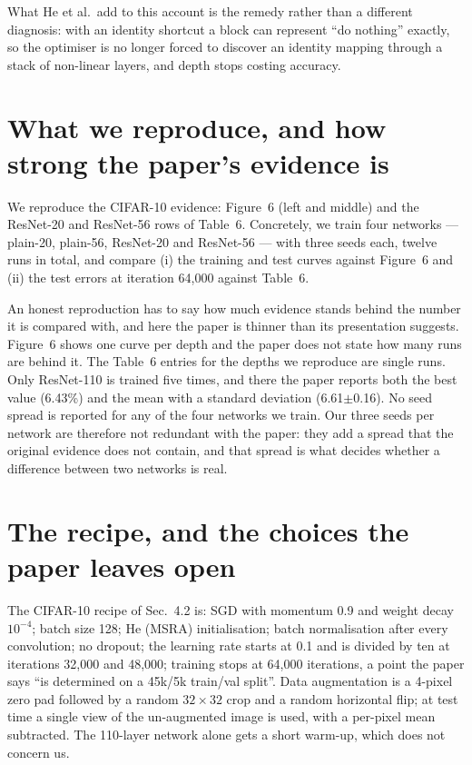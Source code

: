 \documentclass[11pt,a4paper]{article}
\begin{document}
What He et al.\ add to this account is the remedy rather than a different
diagnosis: with an identity shortcut a block can represent ``do nothing''
exactly, so the optimiser is no longer forced to discover an identity mapping
through a stack of non-linear layers, and depth stops costing accuracy.

\section{What we reproduce, and how strong the paper's evidence is}

We reproduce the CIFAR-10 evidence: Figure~6 (left and middle) and the
ResNet-20 and ResNet-56 rows of Table~6. Concretely, we train four networks ---
plain-20, plain-56, ResNet-20 and ResNet-56 --- with three seeds each, twelve
runs in total, and compare (i) the training and test curves against Figure~6
and (ii) the test errors at iteration 64{,}000 against Table~6.

An honest reproduction has to say how much evidence stands behind the number it
is compared with, and here the paper is thinner than its presentation suggests.
Figure~6 shows one curve per depth and the paper does not state how many runs
are behind it. The Table~6 entries for the depths we reproduce are single runs.
Only ResNet-110 is trained five times, and there the paper reports both the best
value (6.43\%) and the mean with a standard deviation (6.61$\pm$0.16). No seed
spread is reported for any of the four networks we train. Our three seeds per
network are therefore not redundant with the paper: they add a spread that the
original evidence does not contain, and that spread is what decides whether a
difference between two networks is real.

\section{The recipe, and the choices the paper leaves open}

The CIFAR-10 recipe of Sec.~4.2 is: SGD with momentum 0.9 and weight decay
$10^{-4}$; batch size 128; He (MSRA) initialisation; batch normalisation after
every convolution; no dropout; the learning rate starts at 0.1 and is divided
by ten at iterations 32{,}000 and 48{,}000; training stops at 64{,}000
iterations, a point the paper says ``is determined on a 45k/5k train/val
split''. Data augmentation is a 4-pixel zero pad followed by a random
$32\times32$ crop and a random horizontal flip; at test time a single view of
the un-augmented image is used, with a per-pixel mean subtracted. The 110-layer
network alone gets a short warm-up, which does not concern us.
\end{document}
